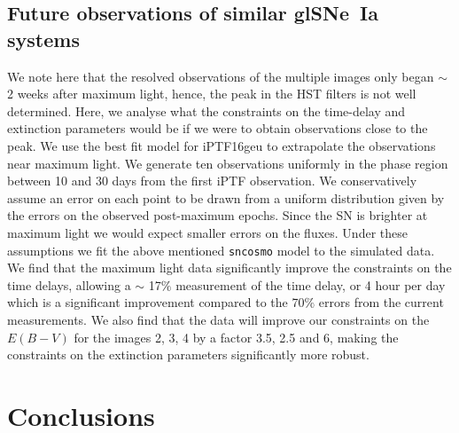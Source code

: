 \documentclass[a4paper,fleqn,usenatbib]{mnras}
\begin{document}
\subsection{Future observations of similar glSNe~Ia systems}
We note here that the resolved observations of the multiple images only began $\sim$ 2 weeks after maximum light, hence, the peak in the HST filters is not well determined. Here, we analyse what the constraints on the time-delay and extinction parameters would be if we were to obtain observations close to the peak. 
We use the best fit model for iPTF16geu to extrapolate the observations near maximum light. We generate ten observations uniformly in the phase region between 10 and 30 days from the first iPTF observation. We conservatively assume an error on each point to be drawn from a uniform distribution given by the errors on the observed post-maximum epochs. Since the SN is brighter at maximum light we would expect smaller errors on the fluxes. Under these assumptions we fit the above mentioned \texttt{sncosmo} model to the simulated data. 
We find that the maximum light data significantly improve the constraints on the time delays, allowing a $\sim$ 17$\%$ measurement of the time delay, or 4 hour per day which is a significant improvement compared to the 70$\%$ errors from the current measurements. We also find that the data will improve our constraints on the $E(B-V)$ for the images 2, 3, 4 by a factor 3.5, 2.5 and 6, making the constraints on the extinction parameters significantly more robust.  

%




\section{Conclusions}
\end{document}
